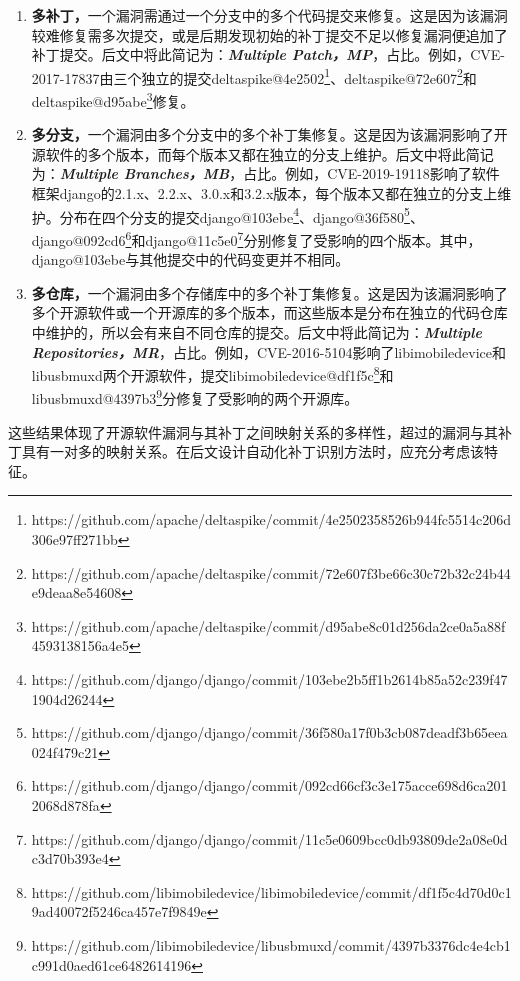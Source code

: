 \begin{enumerate}
\item [（1）] \textbf{多补丁，}一个漏洞需通过一个分支中的多个代码提交来修复。这是因为该漏洞较难修复需多次提交，或是后期发现初始的补丁提交不足以修复漏洞便追加了补丁提交。后文中将此简记为：\textbf{\textit{Multiple Patch，MP}}，占比。例如，CVE-2017-17837由三个独立的提交deltaspike@4e2502\footnote{https://github.com/apache/deltaspike/commit/4e2502358526b944fc5514c206d306e97ff271bb}、deltaspike@72e607\footnote{https://github.com/apache/deltaspike/commit/72e607f3be66c30c72b32c24b44e9deaa8e54608}和\\deltaspike@d95abe\footnote{https://github.com/apache/deltaspike/commit/d95abe8c01d256da2ce0a5a88f4593138156a4e5}修复。
\item [（2）] \textbf{多分支，}一个漏洞由多个分支中的多个补丁集修复。这是因为该漏洞影响了开源软件的多个版本，而每个版本又都在独立的分支上维护。后文中将此简记为：\textbf{\textit{Multiple Branches，MB}}，占比。例如，CVE-2019-19118影响了软件框架django的2.1.x、2.2.x、3.0.x和3.2.x版本，每个版本又都在独立的分支上维护。分布在四个分支的提交django@103ebe\footnote{https://github.com/django/django/commit/103ebe2b5ff1b2614b85a52c239f471904d26244}、django@36f580\footnote{https://github.com/django/django/commit/36f580a17f0b3cb087deadf3b65eea024f479c21}、django@092cd6\footnote{https://github.com/django/django/commit/092cd66cf3c3e175acce698d6ca2012068d878fa}和django@11c5e0\footnote{https://github.com/django/django/commit/11c5e0609bcc0db93809de2a08e0dc3d70b393e4}分别修复了受影响的四个版本。其中，django@103ebe与其他提交中的代码变更并不相同。
\item [（3）] \textbf{多仓库，}一个漏洞由多个存储库中的多个补丁集修复。这是因为该漏洞影响了多个开源软件或一个开源库的多个版本，而这些版本是分布在独立的代码仓库中维护的，所以会有来自不同仓库的提交。后文中将此简记为：\textbf{\textit{Multiple Repositories，MR}}，占比。例如，CVE-2016-5104影响了libimobiledevice和libusbmuxd两个开源软件，提交libimobiledevice@df1f5c\footnote{https://github.com/libimobiledevice/libimobiledevice/commit/df1f5c4d70d0c19ad40072f5246ca457e7f9849e}和libusbmuxd@4397b3\footnote{https://github.com/libimobiledevice/libusbmuxd/commit/4397b3376dc4e4cb1c991d0aed61ce6482614196}分修复了受影响的两个开源库。

\end{enumerate}
这些结果体现了开源软件漏洞与其补丁之间映射关系的多样性，超过的漏洞与其补丁具有一对多的映射关系。在后文设计自动化补丁识别方法时，应充分考虑该特征。

